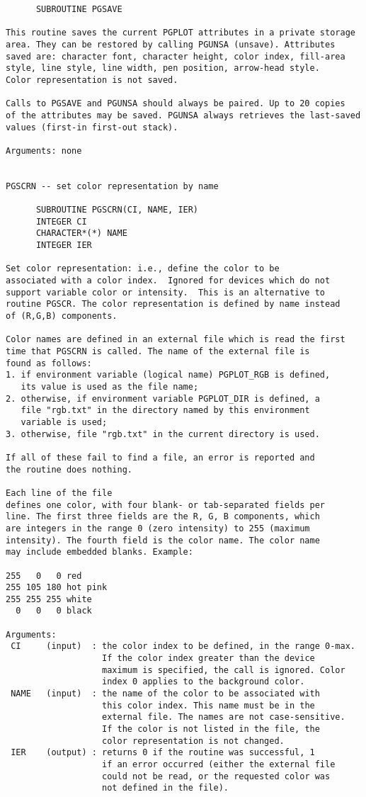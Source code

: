 \begin{small}
\begin{verbatim}
      SUBROUTINE PGSAVE

This routine saves the current PGPLOT attributes in a private storage
area. They can be restored by calling PGUNSA (unsave). Attributes
saved are: character font, character height, color index, fill-area
style, line style, line width, pen position, arrow-head style.
Color representation is not saved.

Calls to PGSAVE and PGUNSA should always be paired. Up to 20 copies
of the attributes may be saved. PGUNSA always retrieves the last-saved
values (first-in first-out stack).

Arguments: none


PGSCRN -- set color representation by name

      SUBROUTINE PGSCRN(CI, NAME, IER)
      INTEGER CI
      CHARACTER*(*) NAME
      INTEGER IER

Set color representation: i.e., define the color to be
associated with a color index.  Ignored for devices which do not
support variable color or intensity.  This is an alternative to
routine PGSCR. The color representation is defined by name instead
of (R,G,B) components.

Color names are defined in an external file which is read the first
time that PGSCRN is called. The name of the external file is
found as follows:
1. if environment variable (logical name) PGPLOT_RGB is defined,
   its value is used as the file name;
2. otherwise, if environment variable PGPLOT_DIR is defined, a
   file "rgb.txt" in the directory named by this environment
   variable is used;
3. otherwise, file "rgb.txt" in the current directory is used.

If all of these fail to find a file, an error is reported and
the routine does nothing.

Each line of the file
defines one color, with four blank- or tab-separated fields per
line. The first three fields are the R, G, B components, which
are integers in the range 0 (zero intensity) to 255 (maximum
intensity). The fourth field is the color name. The color name
may include embedded blanks. Example:

255   0   0 red
255 105 180 hot pink
255 255 255 white
  0   0   0 black

Arguments:
 CI     (input)  : the color index to be defined, in the range 0-max.
                   If the color index greater than the device
                   maximum is specified, the call is ignored. Color
                   index 0 applies to the background color.
 NAME   (input)  : the name of the color to be associated with
                   this color index. This name must be in the
                   external file. The names are not case-sensitive.
                   If the color is not listed in the file, the
                   color representation is not changed.
 IER    (output) : returns 0 if the routine was successful, 1
                   if an error occurred (either the external file
                   could not be read, or the requested color was
                   not defined in the file).



\end{verbatim}
\end{small}
